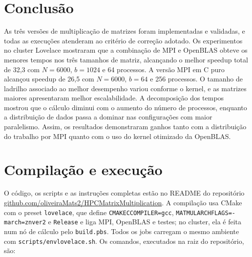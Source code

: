 \documentclass[Portugues]{ic-tese-v3}
\DeclareRobustCommand{\_}{\textunderscore\allowbreak} %
\begin{document}
\section{Conclusão}
As três versões de multiplicação de matrizes foram implementadas e validadas, e todas as execuções atenderam ao critério de correção adotado. Os experimentos no cluster Lovelace mostraram que a combinação de MPI e OpenBLAS obteve os menores tempos nos três tamanhos de matriz, alcançando o melhor speedup total de 32,3 com $N=6000$, $b=1024$ e 64 processos. A versão MPI em C puro alcançou speedup de 26,5 com $N=6000$, $b=64$ e 256 processos. O tamanho de ladrilho associado ao melhor desempenho variou conforme o kernel, e as matrizes maiores apresentaram melhor escalabilidade. A decomposição dos tempos mostrou que o cálculo diminui com o aumento do número de processos, enquanto a distribuição de dados passa a dominar nas configurações com maior paralelismo. Assim, os resultados demonstraram ganhos tanto com a distribuição do trabalho por MPI quanto com o uso do kernel otimizado da OpenBLAS.

\section{Compilação e execução}
O código, os scripts e as instruções completas estão no README do repositório \href{https://github.com/oliveiraMats2/HPC_Matrix_Multiplication}{github.com/\allowbreak oliveiraMats2/\allowbreak HPC\_Matrix\_\allowbreak Multiplication}. A compilação usa CMake com o preset \texttt{lovelace}, que define \texttt{CMAKE\_C\_COMPILER=gcc}, \texttt{MATMUL\_ARCH\_FLAGS=-march=znver2} e \texttt{Release} e liga MPI, OpenBLAS e testes; no cluster, ela é feita num nó de cálculo pelo \texttt{build.pbs}. Todos os jobs carregam o mesmo ambiente com \texttt{scripts/env\_lovelace.sh}. Os comandos, executados na raiz do repositório, são:
\end{document}
